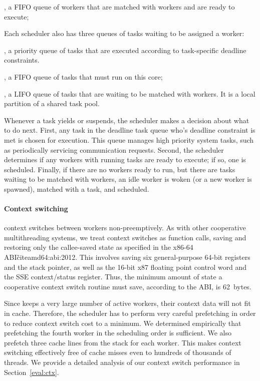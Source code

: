 , a FIFO queue of workers that are
  matched with workers and are ready to execute;

Each scheduler also has three queues of tasks waiting to be assigned a worker:

, a priority queue of tasks that are executed according to task-specific deadline constraints.


, a FIFO queue of tasks that must run on this core;

,  a LIFO queue of tasks that are
  waiting to be matched with workers. It is a local partition of a shared
  task pool.

Whenever a task yields or suspends, the scheduler makes a decision about what
to do next. First, any task in the deadline task queue who's deadline
constraint is met is chosen for execution. This queue manages high priority
system tasks, such as periodically servicing communication requests. Second,
the scheduler determines if any workers with running tasks are ready to
execute; if so, one is scheduled. Finally, if there are no workers ready to
run, but there are tasks waiting to be matched with workers, an idle worker is
woken (or a new worker is spawned), matched with a task, and scheduled.

\paragraph{Context switching} 
\Grappa context switches between workers non-preemptively. As with other
cooperative multithreading systems, we treat context switches as function
calls, saving and restoring only the callee-saved state as specified in the
x86-64 ABI\~cite{amd64:abi:2012}. This involves saving six general-purpose
64-bit registers and the stack pointer, as well as the 16-bit x87 floating
point control word and the SSE context/status register. Thus, the minimum
amount of state a cooperative context switch routine must save, according to
the ABI, is 62~bytes.

Since \Grappa keeps a very large number of active workers, their context data
will not fit in cache. Therefore, the scheduler has to perform very careful
prefetching in order to reduce context switch cost to a minimum. We determined
empirically that prefetching the fourth worker in the scheduling order is
sufficient. We also prefetch three cache lines from the stack for each worker.
This makes context switching effectively free of cache misses even to hundreds
of thousands of threads. We provide a detailed analysis of our context switch
performance in Section~\ref{eval:ctx}.

